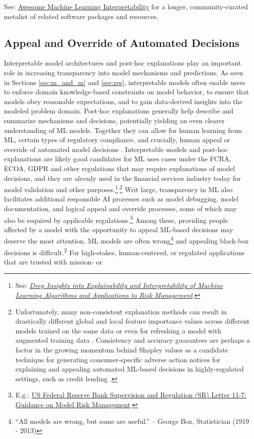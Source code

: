 \documentclass[information,article,submit,moreauthors,pdftex]{definitions/mdpi}
\begin{document}
\noindent See: \href{https://github.com/jphall663/awesome-machine-learning-interpretability}{Awesome Machine Learning Interpretability} for a longer, community-curated metalist of related software packages and resources. 

\subsection{Appeal and Override of Automated Decisions}

Interpretable model architectures and post-hoc explanations play an important role in increasing transparency into model mechanisms and predictions. As seen in Sections \ref{sec:m_and_m} and \ref{sec:res}, interpretable models often enable users to enforce domain knowledge-based constraints on model behavior, to ensure that models obey reasonable expectations, and to gain data-derived insights into the modeled problem domain. Post-hoc explanations generally help describe and summarize mechanisms and decisions, potentially yielding an even clearer understanding of ML models. Together they can allow for human learning from ML, certain types of regulatory compliance, and crucially, human appeal or override of automated model decisions \cite{art_and_sci}. Interpretable models and post-hoc explanations are likely good candidates for ML uses cases under the FCRA, ECOA, GDPR and other regulations that may require explanations of model decisions, and they are already used in the financial services industry today for model validation and other purposes.\footnote{See: \href{https://ww2.amstat.org/meetings/jsm/2019/onlineprogram/AbstractDetails.cfm?abstractid=303053}{\textit{Deep Insights into Explainability and Interpretability of Machine Learning Algorithms and Applications to Risk Management}}.}\textsuperscript{,}\footnote{Unfortunately, many non-consistent explanation methods can result in drastically different global and local feature importance values across different models trained on the same data or even for refreshing a model with augmented training data \cite{molnar}. Consistency and accuracy guarantees are perhaps a factor in the growing momentum behind Shapley values as a candidate technique for generating consumer-specific adverse action notices for explaining and appealing automated ML-based decisions in highly-regulated settings, such as credit lending \cite{bracke2019machine}.} Writ large, transparency in ML also facilitates additional responsible AI processes such as model debugging, model documentation, and logical appeal and override processes, some of which may also be required by applicable regulations.\footnote{E.g.: \href{https://www.federalreserve.gov/supervisionreg/srletters/sr1107.htm}{US Federal Reserve Bank Supervision and Regulation (SR) Letter 11-7: Guidance on Model Risk Management}.} Among these, providing people affected by a model with the opportunity to appeal ML-based decisions may deserve the most attention. ML models are often wrong\footnote{``All models are wrong, but some are useful.'' -- George Box, Statistician (1919 - 2013)} and appealing black-box decisions is difficult.\textsuperscript{2} For high-stakes, human-centered, or regulated applications that are trusted with mission- or 
\end{document}
